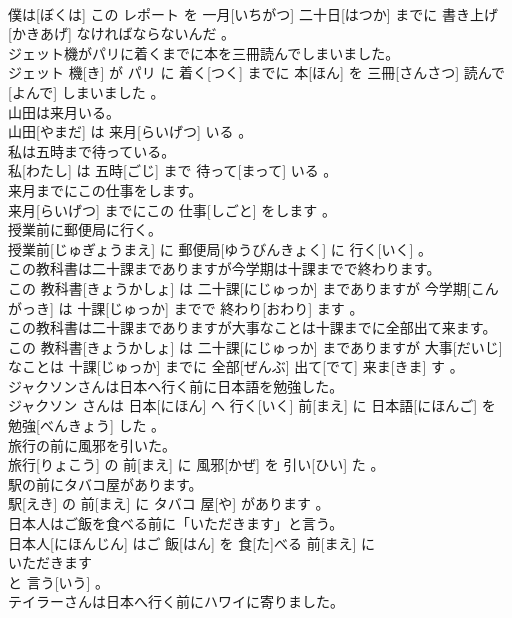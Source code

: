\documentclass[8pt]{extreport}
\begin{document}
\begin{CJK}{UTF8}{min}
\\	僕は[ぼくは] この レポート を 一月[いちがつ] 二十日[はつか] までに 書き上げ[かきあげ] なければならないんだ 。
\\	ジェット機がパリに着くまでに本を三冊読んでしまいました。	
\\	ジェット 機[き] が パリ に 着く[つく] までに 本[ほん] を 三冊[さんさつ] 読んで[よんで] しまいました 。
\\	山田は来月いる。	
\\	山田[やまだ] は 来月[らいげつ] いる 。
\\	私は五時まで待っている。	
\\	私[わたし] は 五時[ごじ] まで 待って[まって] いる 。
\\	来月までにこの仕事をします。	
\\	来月[らいげつ] までにこの 仕事[しごと] をします 。
\\	授業前に郵便局に行く。	
\\	授業前[じゅぎょうまえ] に 郵便局[ゆうびんきょく] に 行く[いく] 。
\\	この教科書は二十課までありますが今学期は十課までで終わります。	
\\	この 教科書[きょうかしょ] は 二十課[にじゅっか] までありますが 今学期[こんがっき] は 十課[じゅっか] までで 終わり[おわり] ます 。
\\	この教科書は二十課までありますが大事なことは十課までに全部出て来ます。	
\\	この 教科書[きょうかしょ] は 二十課[にじゅっか] までありますが 大事[だいじ] なことは 十課[じゅっか] までに 全部[ぜんぶ] 出て[でて] 来ま[きま] す 。
\\	ジャクソンさんは日本へ行く前に日本語を勉強した。	
\\	ジャクソン さんは 日本[にほん] へ 行く[いく] 前[まえ] に 日本語[にほんご] を 勉強[べんきょう] した 。
\\	旅行の前に風邪を引いた。	
\\	旅行[りょこう] の 前[まえ] に 風邪[かぜ] を 引い[ひい] た 。
\\	駅の前にタバコ屋があります。	
\\	駅[えき] の 前[まえ] に タバコ 屋[や] があります 。
\\	日本人はご飯を食べる前に「いただきます」と言う。	
\\	日本人[にほんじん] はご 飯[はん] を 食[た]べる 前[まえ] に 
\\	いただきます 
\\	と 言う[いう] 。
\\	テイラーさんは日本へ行く前にハワイに寄りました。	

\end{CJK}
\end{document}
